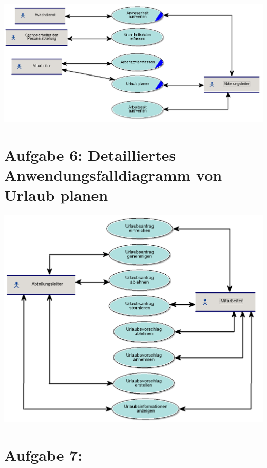 \begin{center}
	\includegraphics[width=0.9\linewidth]{GrobesAnwendungsfalldiagramm.PNG}
\end{center}


\chapter*{Aufgabe 6: Detailliertes Anwendungsfalldiagramm von Urlaub planen}
\setcounter{section}{0}
\addtocounter{chapter}{1}

\begin{center}
	\includegraphics[width=0.9\linewidth]{UrlaubPlanen_AWF.PNG}
\end{center}

\chapter*{Aufgabe 7:}
\setcounter{section}{0}
\addtocounter{chapter}{1}


